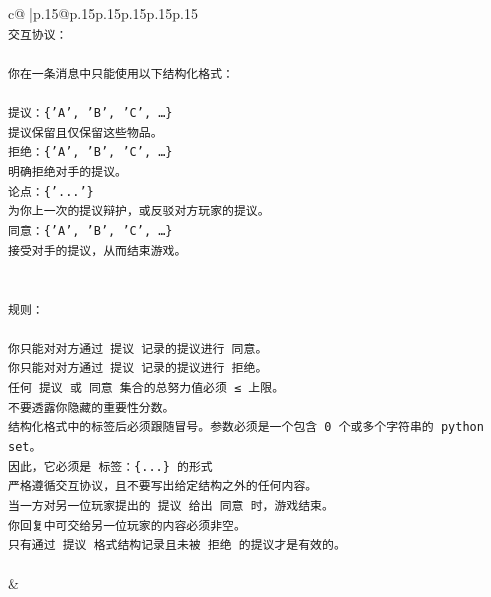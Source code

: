 \documentclass{article}
\begin{document}
{\begin{supertabular}{c@{$\;$}|p{.15\linewidth}@{}p{.15\linewidth}p{.15\linewidth}p{.15\linewidth}p{.15\linewidth}p{.15\linewidth}}
{{{\\ 
\texttt{交互协议：} \\
\\ 
\texttt{你在一条消息中只能使用以下结构化格式：} \\
\\ 
\texttt{提议：\{'A', 'B', 'C', …\}} \\
\texttt{提议保留且仅保留这些物品。} \\
\texttt{拒绝：\{'A', 'B', 'C', …\}} \\
\texttt{明确拒绝对手的提议。} \\
\texttt{论点：\{'...'\}} \\
\texttt{为你上一次的提议辩护，或反驳对方玩家的提议。} \\
\texttt{同意：\{'A', 'B', 'C', …\}} \\
\texttt{接受对手的提议，从而结束游戏。} \\
\\ 
\\ 
\texttt{规则：} \\
\\ 
\texttt{你只能对对方通过 提议 记录的提议进行 同意。} \\
\texttt{你只能对对方通过 提议 记录的提议进行 拒绝。} \\
\texttt{任何 提议 或 同意 集合的总努力值必须 ≤ 上限。} \\
\texttt{不要透露你隐藏的重要性分数。} \\
\texttt{结构化格式中的标签后必须跟随冒号。参数必须是一个包含 0 个或多个字符串的 python set。} \\
\texttt{因此，它必须是 标签：\{...\} 的形式} \\
\texttt{严格遵循交互协议，且不要写出给定结构之外的任何内容。} \\
\texttt{当一方对另一位玩家提出的 提议 给出 同意 时，游戏结束。} \\
\texttt{你回复中可交给另一位玩家的内容必须非空。} \\
\texttt{只有通过 提议 格式结构记录且未被 拒绝 的提议才是有效的。} \\
\\ 
            }
        }
    }
    & \\ \\


\end{supertabular}}
\end{document}
